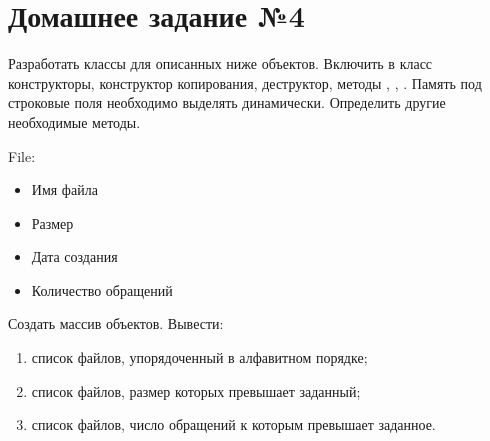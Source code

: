 \section*{Домашнее задание №4}

Разработать классы для описанных ниже объектов. Включить в класс
конструкторы, конструктор копирования, деструктор, методы ,
, . Память под строковые поля необходимо выделять
динамически. Определить другие необходимые методы.

File:
\begin{itemize}
	\item Имя файла
	\item Размер
	\item Дата создания
	\item Количество обращений
\end{itemize}

Создать массив объектов. Вывести:
\begin{enumerate}
	\item список файлов, упорядоченный в алфавитном порядке;
	\item список файлов, размер которых превышает заданный;
	\item список файлов, число обращений к которым превышает заданное.
\end{enumerate}
